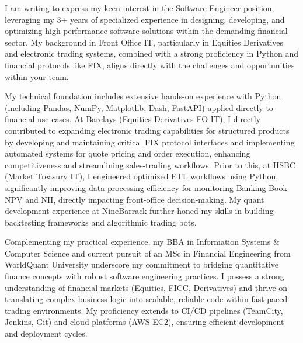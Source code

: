 \documentclass[11pt, a4paper]{article} %
\begin{document}
\medskip %

I am writing to express my keen interest in the Software Engineer position, leveraging my 3+ years of specialized experience in designing, developing, and optimizing high-performance software solutions within the demanding financial sector. My background in Front Office IT, particularly in Equities Derivatives and electronic trading systems, combined with a strong proficiency in Python and financial protocols like FIX, aligns directly with the challenges and opportunities within your team.

My technical foundation includes extensive hands-on experience with Python (including Pandas, NumPy, Matplotlib, Dash, FastAPI) applied directly to financial use cases. At Barclays (Equities Derivatives FO IT), I directly contributed to expanding electronic trading capabilities for structured products by developing and maintaining critical FIX protocol interfaces and implementing automated systems for quote pricing and order execution, enhancing competitiveness and streamlining sales-trading workflows. Prior to this, at HSBC (Market Treasury IT), I engineered optimized ETL workflows using Python, significantly improving data processing efficiency for monitoring Banking Book NPV and NII, directly impacting front-office decision-making. My quant development experience at NineBarrack further honed my skills in building backtesting frameworks and algorithmic trading bots.

Complementing my practical experience, my BBA in Information Systems & Computer Science and current pursuit of an MSc in Financial Engineering from WorldQuant University underscore my commitment to bridging quantitative finance concepts with robust software engineering practices. I possess a strong understanding of financial markets (Equities, FICC, Derivatives) and thrive on translating complex business logic into scalable, reliable code within fast-paced trading environments. My proficiency extends to CI/CD pipelines (TeamCity, Jenkins, Git) and cloud platforms (AWS EC2), ensuring efficient development and deployment cycles.
\end{document}
